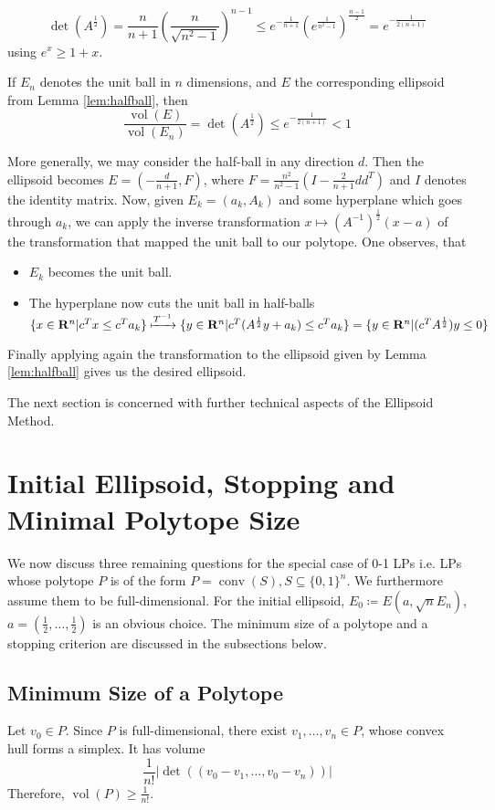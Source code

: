 \documentclass[10pt]{article}
\newcommand{\R}{\mathbf{R}}
\newcommand{\transpose}{T}
\newcommand{\vol}{\operatorname{vol}}
\newcommand{\conv}{\operatorname{conv}}
\begin{document}
\[
\det (A^{\frac{1}{2}}) = \frac{n}{n+1} (\frac{n}{\sqrt{n^2-1}})^{n-1} \le e^{-\frac{1}{n+1}} (e^{\frac{1}{n^2-1}})^{\frac{n-1}{2}} = e^{-\frac{1}{2(n+1)}}
\]
using $e^x \geq 1 + x$.
\begin{corollary}
If $E_n$ denotes the unit ball in $n$ dimensions, and $E$ the corresponding ellipsoid from Lemma \ref{lem:halfball}, then
\[
\frac{\vol (E)}{\vol (E_n)} = \det (A^{\frac{1}{2}}) \le e^{-\frac{1}{2(n+1)}}<1
\]
\end{corollary}
More generally, we may consider the half-ball in any direction $d$. Then the ellipsoid becomes $E = (-\frac{d}{n+1}, F)$, where $F = \frac{n^2}{n^2-1} (I - \frac{2}{n+1} dd^\transpose)$ and $I$ denotes the identity matrix. Now, given $E_k = (a_k, A_k)$ and some hyperplane which goes through $a_k$, we can apply the inverse transformation $x \mapsto (A^{-1})^{\frac{1}{2}} (x-a)$ of the transformation that mapped the unit ball to our polytope. One observes, that
\begin{itemize}
\item $E_k$ becomes the unit ball. 
\item The hyperplane now cuts the unit ball in half-balls $\{x\in \R^n | c^\transpose x \le c^\transpose a_k \} \xmapsto{T^{-1}} \{y\in \R^n | c^\transpose (A^{\frac{1}{2}} y + a_k ) \le c^\transpose a_k\} = \{y \in \R^n | (c^\transpose A^{\frac{1}{2}}) y \le 0 \}$
\end{itemize}
Finally applying again the transformation to the ellipsoid given by Lemma \ref{lem:halfball} gives us the desired ellipsoid.

The next section is concerned with further technical aspects of the Ellipsoid Method.
\section{Initial Ellipsoid, Stopping and Minimal Polytope Size}
We now discuss three remaining questions for the special case of 0-1 LPs i.e. LPs whose polytope $P$ is of the form $P = \conv (S), S \subseteq \{0,1\}^n$. We furthermore assume them to be full-dimensional. For the initial ellipsoid, $E_0 \coloneqq E(a,\sqrt{n}E_n)$, $a=(\frac{1}{2}, \dots, \frac{1}{2})$ is an obvious choice. The minimum size of a polytope and a stopping criterion are discussed in the subsections below.
\subsection{Minimum Size of a Polytope}
Let $v_0 \in P$. Since $P$ is full-dimensional, there exist $v_1, \dots, v_n \in P$, whose convex hull forms a simplex. It has volume
\[
\frac{1}{n!} \left\lvert\det ((v_0-v_1, \dots, v_0-v_n))\right\rvert
\]
Therefore, $\vol (P) \ge \frac{1}{n!}$.
\end{document}
